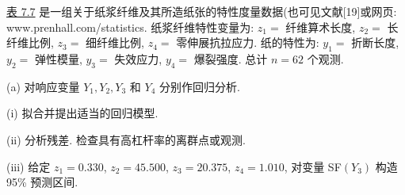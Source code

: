 
\medskip
{}\quad \hyperref[tab:7.7]{表 7.7} 是一组关于纸浆纤维及其所造纸张的特性度量数据(也可见文献[19]或网页: www.prenhall.com/statistics. 纸浆纤维特性变量为: $z_1=$ 纤维算术长度, $z_2=$ 长纤维比例, $z_3=$ 细纤维比例, $z_4=$ 零伸展抗拉应力. 纸的特性为: $y_1=$ 折断长度, $y_2=$ 弹性模量, $y_3=$ 失效应力, $y_4=$ 爆裂强度. 总计 $n=62$ 个观测.

\noindent (a) 对响应变量 $Y_1,Y_2,Y_3$ 和 $Y_4$ 分别作回归分析.

\noindent (i) 拟合并提出适当的回归模型.

\noindent (ii) 分析残差. 检查具有高杠杆率的离群点或观测.

\noindent (iii) 给定 $z_1=0.330$, $z_2=45.500$, $z_3=20.375$, $z_4=1.010$, 对变量 SF$(Y_3)$ 构造 95\% 预测区间.
